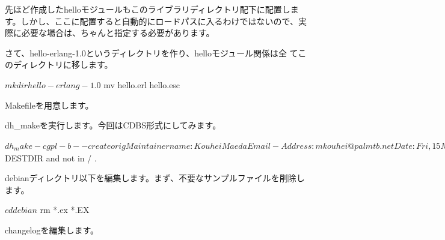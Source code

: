 \documentclass[mingoth,a4paper]{jsarticle}
\begin{document}
先ほど作成したhelloモジュールもこのライブラリディレクトリ配下に配置しま
す。しかし、ここに配置すると自動的にロードパスに入るわけではないので、実
際に必要な場合は、ちゃんと指定する必要があります。

さて、hello-erlang-1.0というディレクトリを作り、helloモジュール関係は全
てこのディレクトリに移します。
\begin{commandline}
$ mkdir hello-erlang-1.0
$ mv hello.erl hello.esc
\end{commandline}

Makefileを用意します。

dh\_makeを実行します。今回はCDBS形式にしてみます。
\begin{commandline}
$ dh_make -c gpl -b --createorig
Maintainer name : Kouhei Maeda
Email-Address   : mkouhei@palmtb.net 
Date            : Fri, 15 May 2009 00:36:24 +0900
Package Name    : hello-erlang
Version         : 1.0
License         : gpl3
Using dpatch    : no
Using quilt     : no
Type of Package : cdbs
Hit <enter> to confirm: 
Skipping creating ../hello-erlang_1.0.orig.tar.gz because it already exists
Done. Please edit the files in the debian/ subdirectory now. You should also
check that the hello-erlang Makefiles install into $DESTDIR and not in / .
\end{commandline}

debianディレクトリ以下を編集します。まず、不要なサンプルファイルを削除し
ます。
\begin{commandline}
$ cd debian
$ rm *.ex *.EX
\end{commandline}

changelogを編集します。
\end{document}
